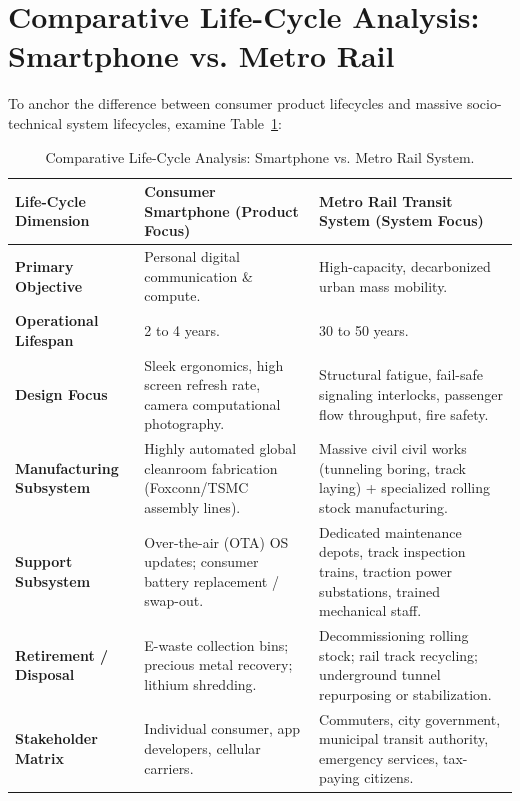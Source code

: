 \section{Comparative Life-Cycle Analysis: Smartphone vs. Metro Rail}
\label{sec:smartphone_vs_metro}

To anchor the difference between consumer product lifecycles and massive socio-technical system lifecycles, examine Table~\ref{tab:phone_vs_metro}:

\begin{table}[htbp]
\centering
\small
\renewcommand{\arraystretch}{1.3}
\begin{tabularx}{\textwidth}{p{3.2cm}p{5.5cm}X}
\toprule
\textbf{Life-Cycle Dimension} & \textbf{Consumer Smartphone (Product Focus)} & \textbf{Metro Rail Transit System (System Focus)} \\
\midrule
\textbf{Primary Objective} & Personal digital communication \& compute. & High-capacity, decarbonized urban mass mobility. \\
\textbf{Operational Lifespan} & 2 to 4 years. & 30 to 50 years. \\
\textbf{Design Focus} & Sleek ergonomics, high screen refresh rate, camera computational photography. & Structural fatigue, fail-safe signaling interlocks, passenger flow throughput, fire safety. \\
\textbf{Manufacturing Subsystem} & Highly automated global cleanroom fabrication (Foxconn/TSMC assembly lines). & Massive civil civil works (tunneling boring, track laying) + specialized rolling stock manufacturing. \\
\textbf{Support Subsystem} & Over-the-air (OTA) OS updates; consumer battery replacement / swap-out. & Dedicated maintenance depots, track inspection trains, traction power substations, trained mechanical staff. \\
\textbf{Retirement / Disposal} & E-waste collection bins; precious metal recovery; lithium shredding. & Decommissioning rolling stock; rail track recycling; underground tunnel repurposing or stabilization. \\
\textbf{Stakeholder Matrix} & Individual consumer, app developers, cellular carriers. & Commuters, city government, municipal transit authority, emergency services, tax-paying citizens. \\
\bottomrule
\end{tabularx}
\caption{Comparative Life-Cycle Analysis: Smartphone vs. Metro Rail System.}
\label{tab:phone_vs_metro}
\end{table}

